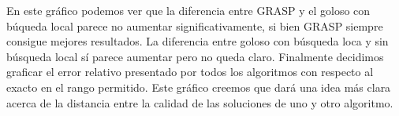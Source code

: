 \begin{figure}[H]
    \begin{minipage}[t]{\linewidth}
		\centering
		\label{fig:ejercicio-6-comparacion-calidad-sin-exacto}
    \end{minipage}
\end{figure}

En este gráfico podemos ver que la diferencia entre GRASP y el goloso con búqueda local
parece no aumentar significativamente, si bien GRASP siempre consigue mejores resultados. La
diferencia entre goloso con búsqueda loca y sin búsqueda local sí parece aumentar pero no queda
claro.
Finalmente decidimos graficar el error relativo presentado por todos los algoritmos con respecto al
exacto en el rango permitido. Este gráfico creemos que dará una idea más clara acerca de la distancia
entre la calidad de las soluciones de uno y otro algoritmo.

\begin{figure}[H]
    \begin{minipage}[t]{\linewidth}
		\centering
		\label{fig:ejercicio-6-comparacion-calidad-error-relativo}
    \end{minipage}
\end{figure}

